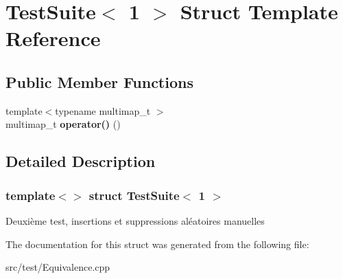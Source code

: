 \hypertarget{structTestSuite_3_011_01_4}{}\section{Test\+Suite$<$ 1 $>$ Struct Template Reference}
\label{structTestSuite_3_011_01_4}
\subsection*{Public Member Functions}
\begin{DoxyCompactItemize}
\item 
\mbox{\label{structTestSuite_3_011_01_4_aa195cba888d14e59594dbc164f7de927}} 
{\footnotesize template$<$typename multimap\+\_\+t $>$ }\\multimap\+\_\+t {\bfseries operator()} ()
\end{DoxyCompactItemize}


\subsection{Detailed Description}
\subsubsection*{template$<$$>$\newline
struct Test\+Suite$<$ 1 $>$}

Deuxième test, insertions et suppressions aléatoires manuelles 

The documentation for this struct was generated from the following file\+:\begin{DoxyCompactItemize}
\item 
src/test/Equivalence.\+cpp\end{DoxyCompactItemize}
